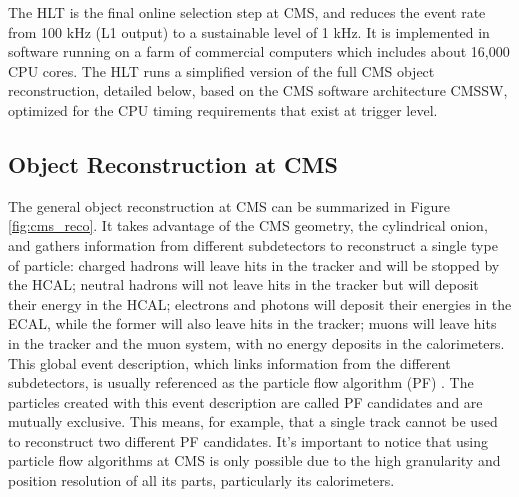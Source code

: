The HLT is the final online selection step at CMS, and reduces the event rate from 100 kHz (L1 output) to a sustainable level of 1 kHz. 
It is implemented in software running on a farm of commercial computers which includes about 16,000 CPU cores. 
The HLT runs a simplified version of the full CMS object reconstruction, detailed below, based on the CMS software architecture CMSSW, optimized for the CPU timing requirements that exist at trigger level. 


\subsection{Object Reconstruction at CMS}

The general object reconstruction at CMS can be summarized in Figure \ref{fig:cms_reco}. 
It takes advantage of the CMS geometry, the cylindrical onion, and gathers information from different subdetectors to reconstruct a single type of particle: charged hadrons will leave hits in the tracker and will be stopped by the HCAL; neutral hadrons will not leave hits in the tracker but will deposit their energy in the HCAL; electrons and photons will deposit their energies in the ECAL, while the former will also leave hits in the tracker; muons will leave hits in the tracker and the muon system, with no energy deposits in the calorimeters. 
This global event description, which links information from the different subdetectors, is usually referenced as the particle flow algorithm (PF) \cite{cms_pf}. 
The particles created with this event description are called PF candidates and are mutually exclusive. 
This means, for example, that a single track cannot be used to reconstruct two different PF candidates.
It's important to notice that using particle flow algorithms at CMS is only possible due to the high granularity and position resolution of all its parts, particularly its calorimeters. 

